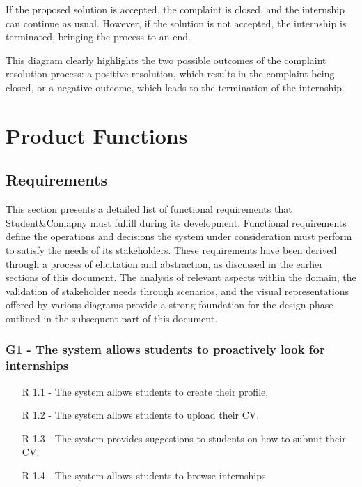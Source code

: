 If the proposed solution is accepted, the complaint is closed, and the internship can
continue as usual. However, if the solution is not accepted, the internship is terminated,
bringing the process to an end.

This diagram clearly highlights the two possible outcomes of the complaint resolution process:
a positive resolution, which results in the complaint being closed, or a negative outcome,
which leads to the termination of the internship.



\newpage
\section{Product Functions}
\subsection{Requirements}
This section presents a detailed list of functional requirements that Student\&Comapny
must fulfill during its development. Functional requirements define the operations
and decisions the system under consideration must perform to satisfy the needs of
its stakeholders. These requirements have been derived through a process of elicitation
and abstraction, as discussed in the earlier sections of this document.
The analysis of relevant aspects within the domain, the validation of stakeholder
needs through scenarios, and the visual representations offered by various diagrams provide
a strong foundation for the design phase outlined in the subsequent part of this document.

\subsubsection{G1 - The system allows students to proactively look for internships}
\hspace*{15mm}
\begin{itemize}
    \item [R 1.1] - The system allows students to create their profile.
    \item [R 1.2] - The system allows students to upload their CV.
    \item [R 1.3] - The system provides suggestions to students on how to submit their CV.
    \item [R 1.4] - The system allows students to browse internships.
\end{itemize}
\hspace*{15mm}

